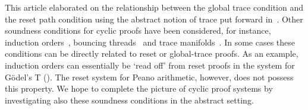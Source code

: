 This article elaborated on the relationship between the global trace condition
and the reset path condition using the abstract notion of trace put forward
in~\parencite{afshariAbstractCyclicProofs2022}. Other soundness
conditions for cyclic proofs have been considered, for instance, induction
orders~\parencite{sprengerStructureInductiveReasoning2003a}, bouncing
threads~\parencite{baeldeBouncingThreadsCircular2022} and trace
manifolds~\parencite{brotherstonSequentCalculusProof2006}. 
In some cases these conditions can be directly related to reset or global-trace proofs. As an example, induction orders
can essentially be `read off' from reset proofs in the system for Gödel's T ().
The reset system for Peano arithmetic, however, does not possess this property.
We hope to complete the
picture of cyclic proof systems by investigating also these soundness conditions in the abstract setting.
